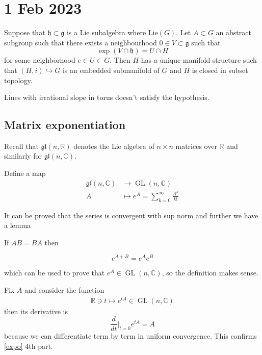 \documentclass[11pt,a4paper]{scrarticle}
\theoremstyle{definition}
\theoremstyle{greenbox}
\newcommand{\R}{\mathbb{R}}
\newcommand{\C}{\mathbb{C}}
\begin{document}
\section{1 Feb 2023}
\vspace{0.5cm}
\begin{thm}
    Suppose that $ \mathfrak{h} \subset \mathfrak{g} $ is a Lie subalgebra where $ \text{Lie}(G) $. Let $ A \subset G $ an abstract subgroup such that there exists a neighbourhood $ 0 \in V \subset \mathfrak{g} $ such that 
    \[ \exp(V \cap \mathfrak{h}) = U \cap H \]
    for some neighborhood $ e \in U \subset G $. Then $ H $ has a unique manifold structure such that $ (H, i) \hookrightarrow G $ is an embedded submanifold of $ G $ and $ H $ is closed in subset topology.
\end{thm}
\begin{remark}
    Lines with irrational slope in torus doesn't satisfy the hypothesis.
\end{remark}

\subsection*{Matrix exponentiation} 

Recall that $ \mathfrak{gl}(n,\R) $ denotes the Lie algebra of $  n \times n $ matrices over $ \R $ and similarly for $ \mathfrak{gl}(n,\C) $. 
\begin{defn}
    Define a map \begin{align*}
        \mathfrak{gl}(n,\C) &\to \operatorname{GL}(n,\C) \\
        A &  \mapsto e^{A} = \sum_{k=0}^{\infty} \frac{A^{k}}{k!} 
    \end{align*}
\end{defn}
It can be proved that the series is convergent with sup norm and further we have a lemma
\begin{lemma}
    If $ AB=BA $ then 
    
    \[ e^{A+B} = e^{A}e^{B} \]
\end{lemma}
which can be used to prove that $ e^{A} \in \operatorname{GL}(n,\C) $, so the definition makes sense.

Fix $ A $  and consider the function \begin{align*}
    \R \ni t \mapsto e^{tA} \in \operatorname{GL}(n,\C)
\end{align*} then its derivative is 
\[ \frac{d}{dt}\bigg|_{t=0}e^{tA} = A \]
because we can differentiate term by term in uniform convergence. This confirms \cref{expo} 4th part.
\end{document}

